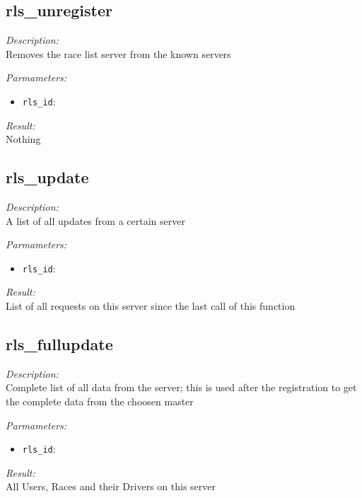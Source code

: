 \subsection{rls\_unregister}

\begin{description}
\item {\it Description:}\\
Removes the race list server from the known servers
\item {\it Parmameters:}
\begin{itemize}
\item {\tt rls\_id}: 
\end{itemize}
\item {\it Result:}\\
Nothing
\end{description}

\subsection{rls\_update}

\begin{description}
\item {\it Description:}\\
A list of all updates from a certain server
\item {\it Parmameters:}
\begin{itemize}
\item {\tt rls\_id}: 
\end{itemize}
\item {\it Result:}\\
List of all requests on this server since the last call of this function
\end{description}

\subsection{rls\_fullupdate}

\begin{description}
\item {\it Description:}\\
Complete list of all data from the server; this is used after the registration to get the complete data from the choosen master
\item {\it Parmameters:}
\begin{itemize}
\item {\tt rls\_id}: 
\end{itemize}
\item {\it Result:}\\
All Users, Races and their Drivers on this server
\end{description}

